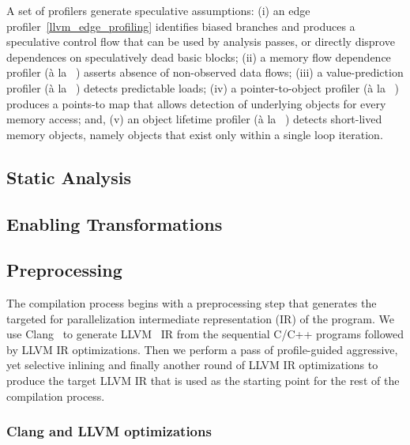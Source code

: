 A set of profilers generate speculative assumptions:
%
(i) an edge profiler~\ref{llvm_edge_profiling} identifies biased
branches and produces a speculative control flow that can be used by
analysis passes, or directly disprove dependences on speculatively
dead basic blocks;
%
(ii) a memory flow dependence  profiler (\`{a} la
~\cite{privateer4citation}) asserts absence of non-observed data
flows;
%
(iii) a value-prediction profiler (\`{a} la
~\cite{privateer11citation}) detects predictable loads;
%
(iv) a pointer-to-object profiler (\`{a} la ~\cite{johnson:12:pldi})
produces a points-to map that allows detection of underlying objects
for every memory access; and,
%
(v) an object lifetime profiler (\`{a} la ~\cite{johnson:12:pldi})
detects short-lived memory objects, namely objects that exist only within a
single loop iteration.
%

\subsection {Static Analysis}


\subsection{Enabling Transformations}
\label{design_transf}



\subsection{Preprocessing}

The compilation process begins with a preprocessing step that
generates the targeted for parallelization intermediate representation
(IR) of the program. We use Clang~\cite{} to generate LLVM~\cite{} IR
from the sequential C/C++ programs followed by LLVM IR optimizations.
Then we perform a pass of profile-guided aggressive, yet selective
inlining and finally another round of LLVM IR optimizations to produce
the target LLVM IR that is used as the starting point for the rest of
the compilation process.

\subsubsection{Clang and LLVM optimizations}

